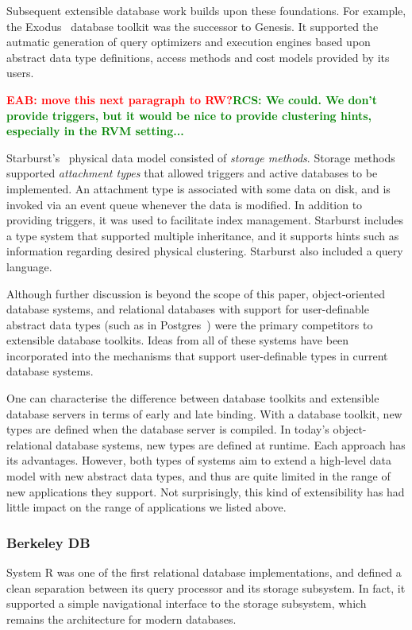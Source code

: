 \documentclass[letterpaper,twocolumn,10pt]{article}
\newcommand{\eab}[1]{\textcolor{red}{\bf EAB: #1}}
\newcommand{\rcs}[1]{\textcolor{green}{\bf RCS: #1}}
\begin{document}
Subsequent extensible database work builds upon these foundations.
For example, the Exodus~\cite{exodus} database toolkit was the successor to
Genesis. It supported the autmatic generation of query optimizers and
execution engines based upon abstract data type definitions, access
methods and cost models provided by its users.

\eab{move this next paragraph to RW?}\rcs{We could.  We don't provide triggers, but it would be nice to provide clustering hints, especially in the RVM setting...}

Starburst's~\cite{starburst} physical data model consisted of {\em
  storage methods}.  Storage methods supported {\em attachment types}
that allowed triggers and active databases to be implemented.  An
attachment type is associated with some data on disk, and is invoked
via an event queue whenever the data is modified.  In addition to
providing triggers, it was used to facilitate index management.
Starburst includes a type system that supported multiple inheritance,
and it supports hints such as information regarding desired physical
clustering.  Starburst also included a query language.

Although further discussion is beyond the scope of this paper,
object-oriented database systems, and relational databases with
support for user-definable abstract data types (such as in
Postgres~\cite{postgres}) were the primary competitors to extensible
database toolkits.  Ideas from all of these systems have been
incorporated into the mechanisms that support user-definable types in
current database systems.

One can characterise the difference between database toolkits and
extensible database servers in terms of early and late binding.  With
a database toolkit, new types are defined when the database server is
compiled.  In today's object-relational database systems, new types
are defined at runtime.  Each approach has its advantages.  However,
both types of systems aim to extend a high-level data model with new abstract data types, and thus are quite limited in the range of new applications they support.  Not surprisingly, this kind of extensibility has had little impact on the range of applications we listed above.

\subsubsection{Berkeley DB}

System R was one of the first relational database implementations, and
defined a clean separation between its query processor and its storage
subsystem.  In fact, it supported a simple navigational interface to
the storage subsystem, which remains the architecture for modern
databases.
\end{document}

